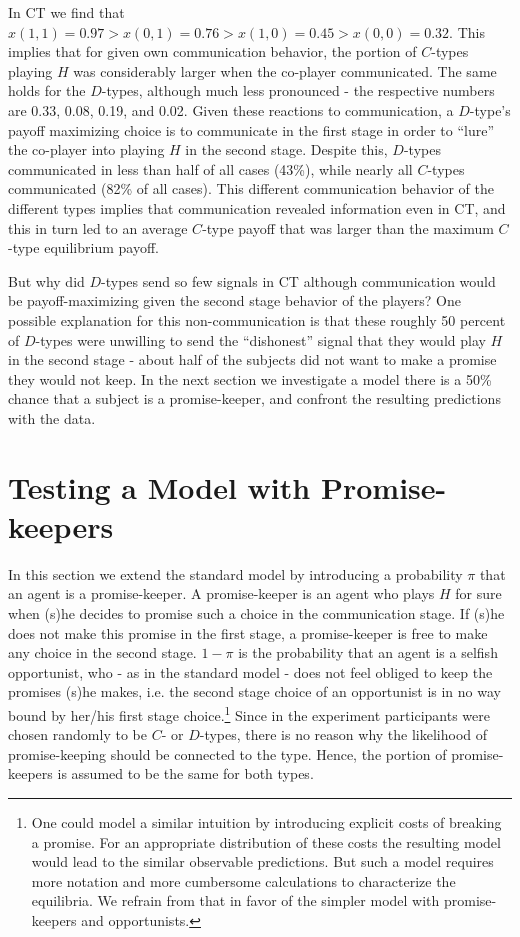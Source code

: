 \documentclass[12pt]{article}
\theoremstyle{break}
\begin{document}
In CT we find that $x(1,1)=0.97 > x(0,1)=0.76 > x(1,0)=0.45 > x(0,0)= 0.32$. This implies that for given own communication behavior, the portion of $C$-types playing $H$ was considerably larger when the co-player communicated. The same holds for the $D$-types, although much less pronounced - the respective numbers are 0.33, 0.08, 0.19, and 0.02. Given these reactions to communication, a $D$-type's payoff maximizing choice is to communicate in the first stage in order to ``lure'' the co-player into playing $H$ in the second stage. Despite this, $D$-types communicated in less than half of all cases (43\%), while nearly all $C$-types communicated (82\% of all cases). This different communication behavior of the different types implies that communication revealed information even in CT, and this in turn led to an average $C$-type payoff that was larger than the maximum $C$-type equilibrium payoff. 

But why did $D$-types send so few signals in CT although communication would be payoff-maximizing given the second stage behavior of the players? One possible explanation for this non-communication is that these roughly 50 percent of $D$-types were unwilling to send the ``dishonest'' signal that they would play $H$ in the second stage - about half  of the subjects did not want to make a promise they would not keep. In the next section we investigate a model there is a 50\% chance that a subject is a promise-keeper, and confront the resulting predictions with the data.

\section{Testing a Model with Promise-keepers}\label{sec:promises}

In this section we extend the standard model by introducing a probability $\pi$ that an agent is a promise-keeper. A promise-keeper is an agent who plays $H$ for sure when (s)he decides to promise such a choice in the communication stage. If (s)he does not make this promise in the first stage, a promise-keeper is free to make any choice in the second stage. $1-\pi$ is the probability that an agent is a selfish opportunist, who - as in the standard model - does not feel obliged to keep the promises (s)he makes, i.e. the second stage choice of an opportunist is in no way bound by her/his first stage choice.\footnote{%
One could model a similar intuition by introducing explicit costs of breaking a promise. For an appropriate distribution of these costs the resulting model would lead to the similar observable predictions. But such a model requires more notation and more cumbersome calculations to characterize the equilibria. We refrain from that in favor of the simpler model with promise-keepers and opportunists.}
Since in the experiment participants were chosen randomly to be $C$- or $D$-types, there is no reason why the likelihood of promise-keeping should be connected to the type. Hence, the portion of promise-keepers is assumed to be the same for both types.
\end{document}
